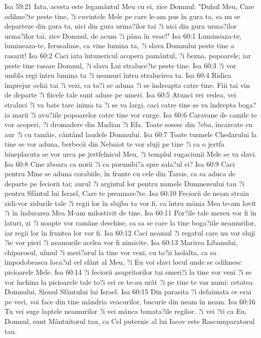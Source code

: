 Isa 59:21  Iata, acesta este legamântul Meu cu ei, zice Domnul: "Duhul Meu, Care odihne?te peste tine, ?i cuvintele Mele pe care le-am pus în gura ta, sa nu se departeze din gura ta, nici din gura urma?ilor tai ?i nici din gura urma?ilor urma?ilor tai, zice Domnul, de acum ?i pâna în veac!"
Isa 60:1  Lumineaza-te, lumineaza-te, Ierusalime, ca vine lumina ta, ?i slava Domnului peste tine a rasarit!
Isa 60:2  Caci iata întunericul acopera pamântul, ?i bezna, popoarele; iar peste tine rasare Domnul, ?i slava Lui straluce?te peste tine.
Isa 60:3  ?i vor umbla regi întru lumina ta ?i neamuri întru stralucirea ta.
Isa 60:4  Ridica împrejur ochii tai ?i vezi, ca to?i se aduna ?i se îndreapta catre tine. Fiii tai vin de departe ?i fiicele tale sunt aduse pe umeri.
Isa 60:5  Atunci vei vedea, vei straluci ?i va bate tare inima ta ?i se va largi, caci catre tine se va îndrepta boga?ia marii ?i avu?iile popoarelor catre tine vor curge.
Isa 60:6  Caravane de camile te vor acoperi, ?i dromadere din Madian ?i Efa. Toate sosesc din ?eba, încarcate cu aur ?i cu tamâie, cântând laudele Domnului.
Isa 60:7  Toate turmele Chedarului la tine se vor aduna, berbecii din Nebaiot te vor sluji pe tine ?i ca o jertfa bineplacuta se vor urca pe jertfelnicul Meu, ?i templul rugaciunii Mele se va slavi.
Isa 60:8  Cine zboara ca norii ?i ca porumbi?a spre sala?ul ei?
Isa 60:9  Caci pentru Mine se aduna corabiile, în frunte cu cele din Tarsis, ca sa aduca de departe pe feciorii tai; aurul ?i argintul lor pentru numele Dumnezeului tau ?i pentru Sfântul lui Israel, Care te preamare?te.
Isa 60:10  Feciorii de neam strain zidi-vor zidurile tale ?i regii lor în slujba ta vor fi, ca întru mânia Mea te-am lovit ?i în îndurarea Mea M-am milostivit de tine.
Isa 60:11  Por?ile tale mereu vor fi în laturi, zi ?i noapte vor ramâne deschise, ca sa se care la tine boga?iile neamurilor, iar regii lor în fruntea lor vor fi.
Isa 60:12  Caci neamul ?i regatul care nu vor sluji ?ie vor pieri ?i neamurile acelea vor fi nimicite.
Isa 60:13  Marirea Libanului, chiparosul, ulmul ?i meri?orul la tine vor veni, cu to?ii laolalta, ca sa împodobeasca loca?ul cel sfânt al Meu, ?i Eu voi slavi locul unde se odihnesc picioarele Mele.
Isa 60:14  ?i feciorii asupritorilor tai smeri?i la tine vor veni ?i se vor închina la picioarele tale to?i cei ce te-au urât ?i pe tine te vor numi: cetatea Domnului, Sionul Sfântului lui Israel.
Isa 60:15  Din parasita ?i defaimata ce erai pe veci, voi face din tine mândria veacurilor, bucurie din neam în neam.
Isa 60:16  Tu vei suge laptele neamurilor ?i vei mânca bunata?ile regilor. ?i vei ?ti ca Eu, Domnul, sunt Mântuitorul tau, ca Cel puternic al lui Iacov este Rascumparatorul tau.
